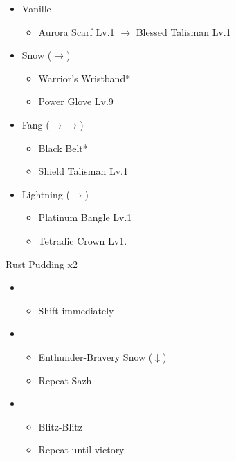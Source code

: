 \begin{menu}
	\begin{itemize}
		\equip
		\begin{itemize}
			\item Vanille
				\begin{itemize}
					\item Aurora Scarf Lv.1 $\rightarrow$ Blessed Talisman Lv.1
				\end{itemize}
			\item Snow ($\rightarrow$)
				\begin{itemize}
					\item Warrior's Wristband*
					\item Power Glove Lv.9
				\end{itemize}
			\item Fang ($\rightarrow\rightarrow$)
				\begin{itemize}
					\item Black Belt*
					\item Shield Talisman Lv.1
				\end{itemize}
			\item Lightning ($\rightarrow$)
				\begin{itemize}
					\item Platinum Bangle Lv.1
					\item Tetradic Crown Lv1.
				\end{itemize}
		\end{itemize}
	\end{itemize}
\end{menu}

\begin{battle}{Rust Pudding x2}
	\begin{itemize}
		\item \fourth
			\begin{itemize}
				\item Shift immediately
			\end{itemize}
		\item \third
			\begin{itemize}
				\item Enthunder-Bravery Snow ($\downarrow$)
				\item Repeat Sazh
			\end{itemize}
		\item \fourth
			\begin{itemize}
				\item Blitz-Blitz
				\item Repeat until victory
			\end{itemize}
	\end{itemize}
\end{battle}

